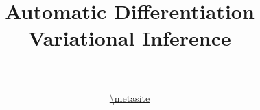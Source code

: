 \documentclass[14pt]{beamer}
\title[ADVI]{Automatic Differentiation Variational Inference}
\date{}
\author[VI Tutorial @ \metahost]{ \metaauthor \\ 
~\\
\url{\metasite}
}
\institute[]{\metaack}
\begin{document}
\frame{\titlepage}

\frame{\tableofcontents}


\end{document}
